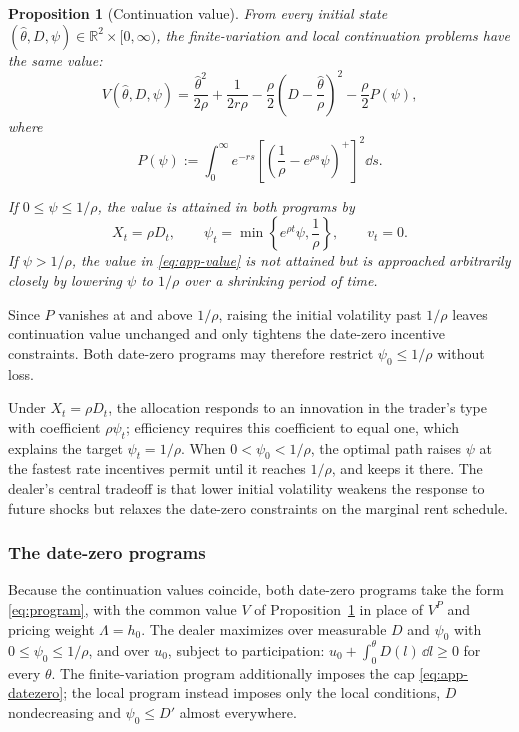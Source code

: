 \documentclass[12pt]{article}
\newtheorem{prop}{Proposition}
\newcommand{\hth}{\hat\theta}
\begin{document}
\begin{prop}[Continuation value]\label{prop:app-fv}
From every initial state
\((\hth,D,\psi)\in\mathbb R^2\times[0,\infty)\), the finite-variation
and local continuation problems have the same value:
\begin{equation}\label{eq:app-value}
  V(\hth,D,\psi)
  =
  \frac{\hth^2}{2\rho}
  +\frac{1}{2r\rho}
  -\frac{\rho}{2}
    \left(D-\frac{\hth}{\rho}\right)^2
  -\frac{\rho}{2}P(\psi),
\end{equation}
where
\[
  P(\psi)
  :=
  \int_0^\infty e^{-rs}
  \left[
    \left(\frac1\rho-e^{\rho s}\psi\right)^+
  \right]^2\dd s.
\]

If \(0\leq\psi\leq1/\rho\), the value is attained in both programs by
\[
  X_t=\rho D_t,
  \qquad
  \psi_t
  =
  \min\left\{e^{\rho t}\psi,\frac1\rho\right\},
  \qquad
  v_t=0.
\]
If \(\psi>1/\rho\), the value in \eqref{eq:app-value} is not attained
but is approached arbitrarily closely by lowering \(\psi\) to
\(1/\rho\) over a shrinking period of time.
\end{prop}

Since \(P\) vanishes at and above \(1/\rho\), raising the initial
volatility past \(1/\rho\) leaves continuation value unchanged and only
tightens the date-zero incentive constraints. Both date-zero programs
may therefore restrict \(\psi_0\leq1/\rho\) without loss.

Under \(X_t=\rho D_t\), the allocation responds to an innovation in the
trader's type with coefficient \(\rho\psi_t\); efficiency requires this
coefficient to equal one, which explains the target \(\psi_t=1/\rho\).
When \(0<\psi_0<1/\rho\), the optimal path raises \(\psi\) at the
fastest rate incentives permit until it reaches \(1/\rho\), and keeps
it there. The dealer's central tradeoff is that lower initial volatility weakens the response to future
shocks but relaxes the date-zero constraints on the marginal rent
schedule.

\subsubsection{The date-zero programs}\label{sub:app-numerics}

Because the continuation values coincide, both date-zero programs take
the form \eqref{eq:program}, with the common value \(V\) of
Proposition~\ref{prop:app-fv} in place of \(V^{P}\) and pricing weight
\(\Lambda=h_0\). The dealer maximizes over measurable \(D\) and
\(\psi_0\) with \(0\leq\psi_0\leq1/\rho\), and over \(u_0\),
subject to participation: \(u_0+\int_0^\theta D(l)\,\dd l\geq0\) for
every \(\theta\). The finite-variation program additionally imposes the cap
\eqref{eq:app-datezero}; the local program instead imposes only the
local conditions, \(D\) nondecreasing and \(\psi_0\leq D'\) almost
everywhere.
\end{document}
